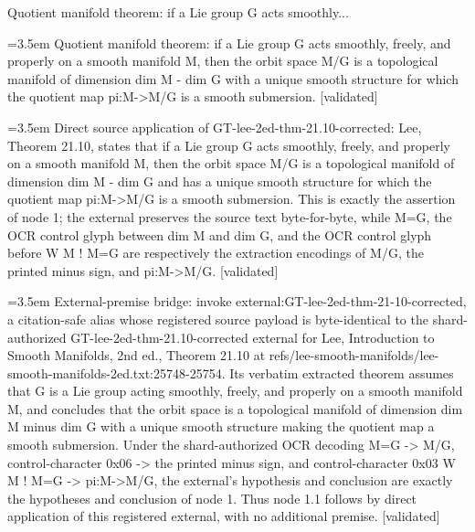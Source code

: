 \documentclass{article}
\newcommand{\step}[1]{\par\noindent\hangindent=3.5em\hangafter=1%
  \makebox[3.5em][l]{\textbf{#1.}}}
\newcommand{\steptag}[1]{\hfill{\small\textsf{[#1]}}}
\begin{document}
\begin{proofbox}{Quotient manifold theorem: if a Lie group G acts smoothly...}
\step{1} Quotient manifold theorem: if a Lie group G acts smoothly, freely, and properly on a smooth manifold M, then the orbit space M/G is a topological manifold of dimension dim M - dim G with a unique smooth structure for which the quotient map pi:M->M/G is a smooth submersion. \steptag{validated} \\[6pt]
\step{1.1} Direct source application of GT-lee-2ed-thm-21.10-corrected: Lee, Theorem 21.10, states that if a Lie group G acts smoothly, freely, and properly on a smooth manifold M, then the orbit space M/G is a topological manifold of dimension dim M - dim G and has a unique smooth structure for which the quotient map pi:M->M/G is a smooth submersion. This is exactly the assertion of node 1; the external preserves the source text byte-for-byte, while M=G, the OCR control glyph between dim M and dim G, and the OCR control glyph before W M ! M=G are respectively the extraction encodings of M/G, the printed minus sign, and pi:M->M/G. \steptag{validated} \\[6pt]
\step{1.1.1} External-premise bridge: invoke external:GT-lee-2ed-thm-21-10-corrected, a citation-safe alias whose registered source payload is byte-identical to the shard-authorized GT-lee-2ed-thm-21.10-corrected external for Lee, Introduction to Smooth Manifolds, 2nd ed., Theorem 21.10 at refs/lee-smooth-manifolds/lee-smooth-manifolds-2ed.txt:25748-25754. Its verbatim extracted theorem assumes that G is a Lie group acting smoothly, freely, and properly on a smooth manifold M, and concludes that the orbit space is a topological manifold of dimension dim M minus dim G with a unique smooth structure making the quotient map a smooth submersion. Under the shard-authorized OCR decoding M=G -> M/G, control-character 0x06 -> the printed minus sign, and control-character 0x03 W M ! M=G -> pi:M->M/G, the external's hypothesis and conclusion are exactly the hypotheses and conclusion of node 1. Thus node 1.1 follows by direct application of this registered external, with no additional premise. \steptag{validated} \\[6pt]

\end{proofbox}
\end{document}
